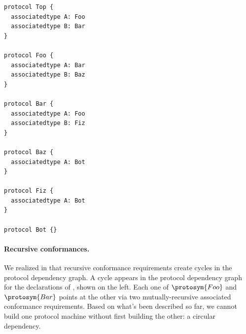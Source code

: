 \documentclass[../generics]{subfiles}
\begin{document}
\begin{listing}\label{protocol component listing}
\begin{Verbatim}
protocol Top {
  associatedtype A: Foo
  associatedtype B: Bar
}

protocol Foo {
  associatedtype A: Bar
  associatedtype B: Baz
}

protocol Bar {
  associatedtype A: Foo
  associatedtype B: Fiz
}

protocol Baz {
  associatedtype A: Bot
}

protocol Fiz {
  associatedtype A: Bot
}

protocol Bot {}
\end{Verbatim}
\end{listing}

\begin{figure}
\end{figure}

\paragraph{Recursive conformances.}
We realized in  that recursive conformance requirements create cycles in the protocol dependency graph. A cycle appears in the protocol dependency graph for the declarations of , shown on the left. Each one of $\protosym{Foo}$ and~$\protosym{Bar}$ points at the other via two mutually-recursive associated conformance requirements. Based on what's been described so far, we cannot build one protocol machine without first building the other: a circular dependency.
\end{document}
